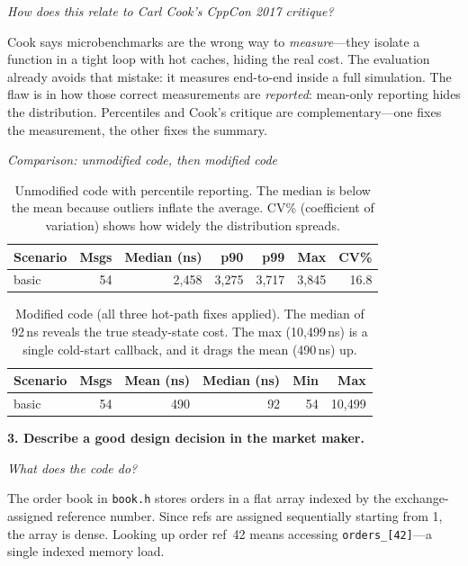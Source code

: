 \documentclass[11pt]{article}
\newcommand{\prompt}[1]{\par\medskip\noindent\textbf{#1}\par\smallskip\noindent\ignorespaces}
\newcommand{\sq}[1]{\par\smallskip\noindent\textit{#1}\par\noindent\ignorespaces}
\begin{document}
\sq{How does this relate to Carl Cook's CppCon 2017 critique?}
Cook says microbenchmarks are the wrong way to \emph{measure}---they isolate a function in a tight loop with hot caches, hiding the real cost. The evaluation already avoids that mistake: it measures end-to-end inside a full simulation. The flaw is in how those correct measurements are \emph{reported}: mean-only reporting hides the distribution. Percentiles and Cook's critique are complementary---one fixes the measurement, the other fixes the summary.

\sq{Comparison: unmodified code, then modified code}

\begin{table}[H]
\centering
\small
\begin{tabular}{@{}lrrrrrr@{}}
\toprule
\textbf{Scenario} & \textbf{Msgs} & \textbf{Median (ns)} & \textbf{p90} & \textbf{p99} & \textbf{Max} & \textbf{CV\%} \\
\midrule
basic & 54 & 2{,}458 & 3{,}275 & 3{,}717 & 3{,}845 & 16.8 \\
\bottomrule
\end{tabular}
\caption{Unmodified code with percentile reporting. The median is below the mean because outliers inflate the average. CV\% (coefficient of variation) shows how widely the distribution spreads.}
\end{table}

\begin{table}[H]
\centering
\small
\begin{tabular}{@{}lrrrrr@{}}
\toprule
\textbf{Scenario} & \textbf{Msgs} & \textbf{Mean (ns)} & \textbf{Median (ns)} & \textbf{Min} & \textbf{Max} \\
\midrule
basic & 54 & 490 & 92 & 54 & 10{,}499 \\
\bottomrule
\end{tabular}
\caption{Modified code (all three hot-path fixes applied). The median of 92\,ns reveals the true steady-state cost. The max (10{,}499\,ns) is a single cold-start callback, and it drags the mean (490\,ns) up.}
\end{table}



\prompt{3. Describe a good design decision in the market maker.}

\sq{What does the code do?}
The order book in \texttt{book.h} stores orders in a flat array indexed by the exchange-assigned reference number. Since refs are assigned sequentially starting from 1, the array is dense. Looking up order ref~42 means accessing \texttt{orders\_[42]}---a single indexed memory load.
\end{document}
